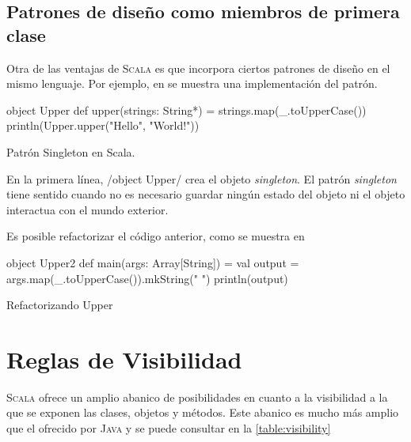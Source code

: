 \subsection{Patrones de diseño como miembros de primera clase}
\label{subsec:patterns}

Otra de las ventajas de \textsc{Scala} es que incorpora ciertos patrones de
diseño en el mismo lenguaje. Por ejemplo, en  se muestra una
implementación del patrón.

\begin{listing}[H]
  \begin{scalacode}
    object Upper {
      def upper(strings: String*) = strings.map(_.toUpperCase())
    }
    println(Upper.upper("Hello", "World!"))
  \end{scalacode}
  \caption{Patrón Singleton en Scala.}
  \label{lst:object}
\end{listing}

En la primera línea, \scalainline/object Upper/ crea el objeto
\emph{singleton}. El patrón \emph{singleton} tiene sentido cuando no es
necesario guardar ningún estado del objeto ni el objeto interactua con el mundo
exterior.

Es posible refactorizar el código anterior, como se muestra en

\begin{listing}[H]
  \begin{scalacode}
    object Upper2 {
      def main(args: Array[String]) = {
        val output = args.map(_.toUpperCase()).mkString(" ")
        println(output)
      }
    }
  \end{scalacode}
  \caption{Refactorizando Upper}
  \label{lst:object2}
\end{listing}

\section{Reglas de Visibilidad}
\label{sec:visibility}

\textsc{Scala} ofrece un amplio abanico de posibilidades en cuanto a la
visibilidad a la que se exponen las clases, objetos y métodos. Este abanico es
mucho más amplio que el ofrecido por \textsc{Java} y se puede consultar en la
\autoref{table:visibility}

